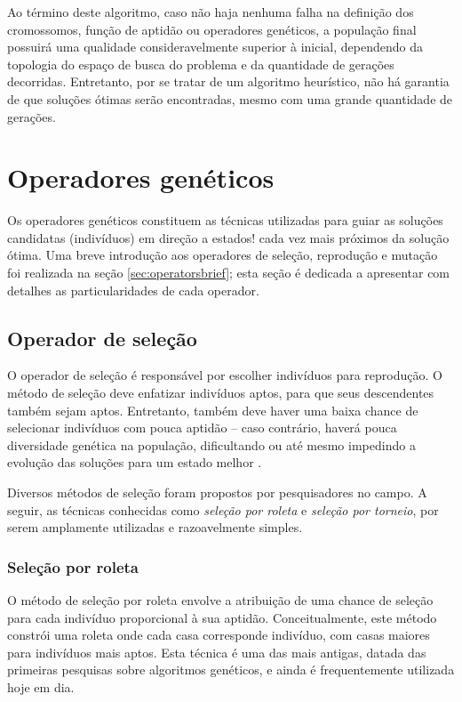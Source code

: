 \documentclass[12pt]{article}
\begin{document}
Ao término deste algoritmo, caso não haja nenhuma falha na definição dos cromossomos, função de aptidão ou operadores genéticos, a população final possuirá uma qualidade consideravelmente superior à inicial, dependendo da topologia do espaço de busca do problema e da quantidade de gerações decorridas. Entretanto, por se tratar de um algoritmo heurístico, não há garantia de que soluções ótimas serão encontradas, mesmo com uma grande quantidade de gerações.

\section{Operadores genéticos} \label{sec:geneticoperators}

Os operadores genéticos constituem as técnicas utilizadas para guiar as soluções candidatas (indivíduos) em direção a estados! cada vez mais próximos da solução ótima. Uma breve introdução aos operadores de seleção, reprodução e mutação foi realizada na seção \ref{sec:operatorsbrief}; esta seção é dedicada a apresentar com detalhes as particularidades de cada operador.

\subsection{Operador de seleção}

O operador de seleção é responsável por escolher indivíduos para reprodução. O método de seleção deve enfatizar indivíduos aptos, para que seus descendentes também sejam aptos. Entretanto, também deve haver uma baixa chance de selecionar indivíduos com pouca aptidão -- caso contrário, haverá pouca diversidade genética na população, dificultando ou até mesmo impedindo a evolução das soluções para um estado melhor \cite{Mitchell1998}.

Diversos métodos de seleção foram propostos por pesquisadores no campo. A seguir, as técnicas conhecidas como \textit{seleção por roleta} e \textit{seleção por torneio}, por serem amplamente utilizadas e razoavelmente simples.

\subsubsection{Seleção por roleta} \label{sec:roulette}

O método de seleção por roleta envolve a atribuição de uma chance de seleção para cada indivíduo proporcional à sua aptidão. Conceitualmente, este método constrói uma roleta onde cada casa corresponde indivíduo, com casas maiores para indivíduos mais aptos. Esta técnica é uma das mais antigas, datada das primeiras pesquisas sobre algoritmos genéticos, e ainda é frequentemente utilizada hoje em dia.
\end{document}
